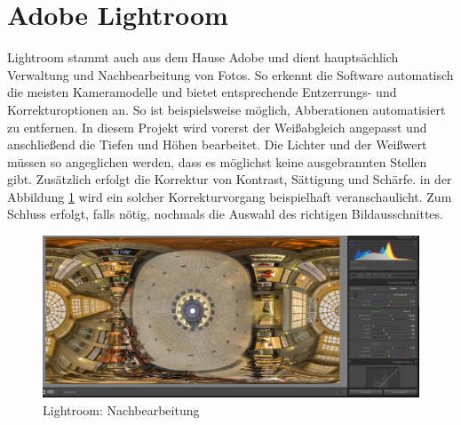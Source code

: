 \documentclass[liststotoc,bibtotoc,fontsize=14pt,]{scrreprt}
\begin{document}
	
	\section{Adobe Lightroom}
	\label{sec:lightroom}
	Lightroom stammt auch aus dem Hause Adobe und dient hauptsächlich Verwaltung und Nachbearbeitung von Fotos. So erkennt die Software automatisch die meisten Kameramodelle und bietet entsprechende Entzerrungs- und Korrekturoptionen an. So ist beispielsweise möglich, Abberationen automatisiert zu entfernen. In diesem Projekt wird vorerst der Weißabgleich angepasst und anschließend die Tiefen und Höhen bearbeitet. Die Lichter und der Weißwert müssen so angeglichen werden, dass es möglichst keine ausgebrannten Stellen gibt. Zusätzlich erfolgt die Korrektur von Kontrast, Sättigung und Schärfe. in der Abbildung \ref{img:lightroom_bearbeitung} wird ein solcher Korrekturvorgang beispielhaft veranschaulicht. Zum Schluss erfolgt, falls nötig, nochmals die Auswahl des richtigen Bildausschnittes.
	\begin{figure}[H]
		\includegraphics[width=\linewidth]{img/steps/Lightroom_kugel.PNG}
		\caption{Lightroom: Nachbearbeitung}
		\label{img:lightroom_bearbeitung}
	\end{figure}

	
	\begin{thebibliography}{999}
	
		
	\end{thebibliography}
	
\end{document}
